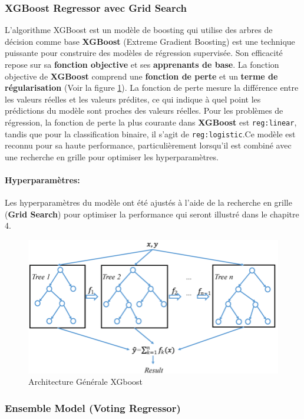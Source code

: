 \newpage
\subsubsection{XGBoost Regressor avec Grid Search}

L'algorithme XGBoost  est un modèle de boosting qui utilise des arbres de décision comme base
\textbf{XGBoost} (Extreme Gradient Boosting) est une technique puissante pour construire des modèles de régression supervisée. Son efficacité repose sur sa \textbf{fonction objective} et ses \textbf{apprenants de base}. La fonction objective de \textbf{XGBoost} comprend une \textbf{fonction de perte} et un \textbf{terme de régularisation} (Voir la figure \ref{fig:schemaxgboost}). La fonction de perte mesure la différence entre les valeurs réelles et les valeurs prédites, ce qui indique à quel point les prédictions du modèle sont proches des valeurs réelles. Pour les problèmes de régression, la fonction de perte la plus courante dans \textbf{XGBoost} est \texttt{reg:linear}, tandis que pour la classification binaire, il s'agit de \texttt{reg:logistic}.Ce modèle est reconnu pour sa haute performance, particulièrement lorsqu'il est combiné avec une recherche en grille pour optimiser les hyperparamètres.


\paragraph*{Hyperparamètres:}
Les hyperparamètres du modèle ont été ajustés à l'aide de la recherche en grille (\textbf{Grid Search}) pour optimiser la performance qui seront illustré dans le chapitre 4.

\begin{figure}[h!]
	\centering
	\includegraphics[width=0.8\linewidth]{images/schema_xgboost}
	\caption{Architecture Générale XGboost~\cite{xgboostref}}
	\label{fig:schemaxgboost}
\end{figure}


\subsubsection{Ensemble Model (Voting Regressor)}

